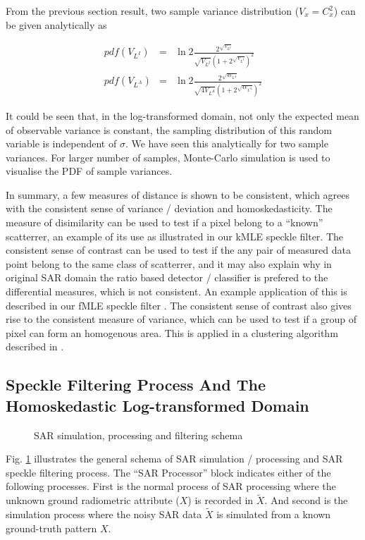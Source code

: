 \documentclass[journal]{IEEEtran}
\begin{document}
From the previous section result, two sample variance distribution ($V_x = C_x^2$) can be given analytically as

\begin{eqnarray}
pdf(V_{L^I}) &=& 
	\ln2 \frac{ 2^{\sqrt{V_{L^I}}}}{\sqrt{V_{L^I}} \left( 1+2^{\sqrt{V_{L^I}}} \right)^2} \\
pdf(V_{L^A}) &=&
	\ln2 \frac{2^{\sqrt{4V_{L^A}}}}{\sqrt{4V_{L^A}} \left( 1+2^{\sqrt{4V_{L^A}}} \right)^2} 
\end{eqnarray}

It could be seen that, in the log-transformed domain, not only the expected mean of observable variance is constant, the sampling distribution of this random variable is independent of $\sigma$. 
We have seen this analytically for two sample variances. 
For larger number of samples, Monte-Carlo simulation is used to visualise the PDF of sample variances. 

In summary, a few measures of distance is shown to be consistent, which agrees with the consistent sense of variance / deviation and homoskedasticity.
The measure of disimilarity can be used to test if a pixel belong to a ``known'' scatterrer, an example of its use as illustrated in our kMLE speckle filter.
The consistent sense of contrast can be used to test if the any pair of measured data point belong to the same class of scatterrer, 
	and it may also explain why in original SAR domain the ratio based detector / classifier is prefered to the differential measures, which is not consistent. 
An example application of this is described in our fMLE speckle filter \cite{Le_2011_ACRS}.
The consistent sense of contrast also gives rise to the consistent measure of variance, which can be used to test if a group of pixel can form an homogenous area.
This is applied in a clustering algorithm described in \cite{Le_2010_ACRS}.

\subsection{ Speckle Filtering Process And The Homoskedastic Log-transformed Domain}
\label{sec:schema_log_images}

\begin{figure}
 \centering
 \epsfxsize=2.4in
 \epsfysize=1.2in
\caption{SAR simulation, processing and filtering schema}
\label{fig:simul_process_filter_schema}
\end{figure}

Fig. \ref{fig:simul_process_filter_schema} illustrates the general schema of SAR simulation / processing and SAR speckle filtering process.
The ``SAR Processor'' block indicates either of the following processes.
First is the normal process of SAR processing where the unknown ground radiometric attribute ($X$) is recorded in $\tilde{X}$.
And second is the simulation process where the noisy SAR data $\tilde{X}$ is simulated from a known ground-truth pattern $X$.
\end{document}
